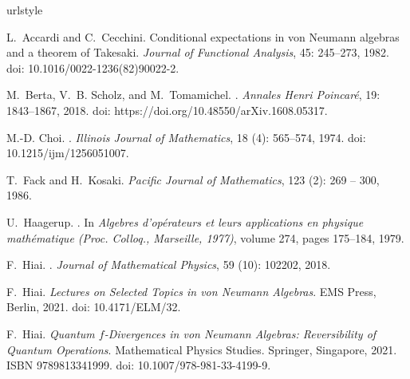 \documentclass[12pt]{article}
\theoremstyle{definition}
\theoremstyle{remark}
\numberwithin{equation}{section}
\begin{document}
\begin{thebibliography}{27}
\providecommand{\url}[1]{\texttt{#1}}
\expandafter\ifx\csname urlstyle\endcsname\relax
  \providecommand{\doi}[1]{doi: #1}\else
  \providecommand{\doi}{doi: \begingroup \urlstyle{rm}\Url}\fi

L.~Accardi and C.~Cecchini.
\newblock Conditional expectations in von {Neumann} algebras and a theorem of
  {T}akesaki.
\newblock \emph{Journal of Functional Analysis}, 45: 245--273, 1982.
\newblock \doi{10.1016/0022-1236(82)90022-2}.

M.~Berta, V.~B. Scholz, and M.~Tomamichel.
.
\newblock \emph{Annales Henri Poincar{\'e}}, 19: 1843--1867, 2018.
\newblock \doi{https://doi.org/10.48550/arXiv.1608.05317}.

M.-D. Choi.
.
\newblock \emph{Illinois Journal of Mathematics}, 18 (4):
  565--574, 1974.
\newblock \doi{10.1215/ijm/1256051007}.

T.~Fack and H.~Kosaki.
\newblock \emph{Pacific Journal of Mathematics}, 123 (2): 269
  -- 300, 1986.

U.~Haagerup.
.
\newblock In \emph{Algebres d’op{\'e}rateurs et leurs applications en
  physique math{\'e}matique (Proc. Colloq., Marseille, 1977)}, volume 274,
  pages 175--184, 1979.

F.~Hiai.
.
\newblock \emph{Journal of Mathematical Physics}, 59 (10):
  102202, 2018.

F.~Hiai.
\newblock \emph{Lectures on Selected Topics in von Neumann Algebras}.
\newblock EMS Press, Berlin, 2021{}.
\newblock \doi{10.4171/ELM/32}.

F.~Hiai.
\newblock \emph{Quantum $f$-Divergences in von Neumann Algebras: Reversibility
  of Quantum Operations}.
\newblock Mathematical Physics Studies. Springer, Singapore,
  2021{}.
\newblock ISBN 9789813341999.
\newblock \doi{10.1007/978-981-33-4199-9}.


\end{thebibliography}
\end{document}
